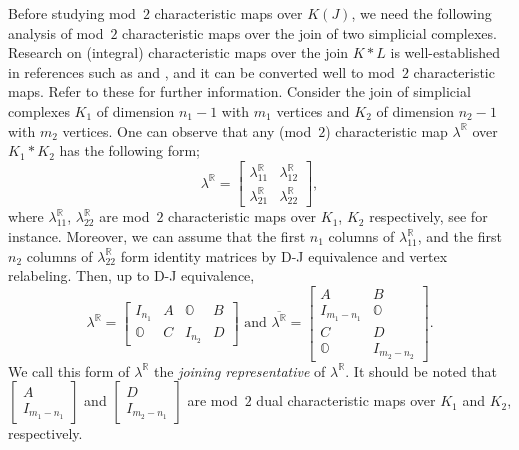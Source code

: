 \documentclass[11pt]{amsart}
\theoremstyle{plain}
\numberwithin{equation}{section}
\theoremstyle{definition}
\newcommand{\R}{\mathbb{R}}
\begin{document}
Before studying mod~$2$ characteristic maps over $K(J)$, we need the following analysis of mod~$2$ characteristic maps over the join of two simplicial complexes.
Research on (integral) characteristic maps over the join $K*L$ is well-established in references such as \cite{Choi-Park2016IJM} and \cite{Dobrinskaya2001},  and it can be converted well to mod~$2$ characteristic maps. 
Refer to these for further information.
Consider the join of simplicial complexes $K_1$ of dimension $n_1-1$ with $m_1$ vertices and $K_2$ of dimension $n_2-1$ with $m_2$ vertices.
One can observe that any (mod~$2$) characteristic map $\lambda^\R$ over $K_1 \ast K_2$ has the following form;
$$
  \lambda^\R = \begin{bmatrix} \lambda^\R_{11}  &  \lambda^\R_{12} \\
                       \lambda^\R_{21} &  \lambda^\R_{22}                                                                \end{bmatrix},
$$
where $\lambda^\R_{11}$, $\lambda^\R_{22}$ are mod~$2$ characteristic maps over $K_1$, $K_2$ respectively, see \cite[Lemma~3.1]{Choi-Park2016IJM} for instance.
Moreover, we can assume that the first $n_1$ columns of $\lambda^\R_{11}$, and the first $n_2$ columns of $\lambda^\R_{22}$ form identity matrices by D-J equivalence and vertex relabeling.
Then, up to D-J equivalence,
\begin{equation} \label{eq:joining representative}
    \lambda^\R = \begin{bmatrix}  I_{n_1} & A  & \mathds{O} & B \\
                                    \mathds{O} & C & I_{n_2} & D \end{bmatrix}
    \text{ and }
    \overline{\lambda^\R} = \begin{bmatrix}
                                     A & B \\
                                     I_{m_1-n_1} & \mathds{O} \\
                                     C & D \\
                                     \mathds{O} & I_{m_2-n_2} 
                                   \end{bmatrix}.
\end{equation}
We call this form of $\lambda^\R$ the \emph{joining representative} of $\lambda^\R$.
It should be noted that $\begin{bmatrix}
                           A \\
                           I_{m_1 - n_1}  
                         \end{bmatrix}$ and $\begin{bmatrix}
                                               D \\
                                               I_{m_2 - n_1} 
                                             \end{bmatrix}$ are mod~$2$ dual characteristic maps over $K_1$ and $K_2$, respectively.
\end{document}
